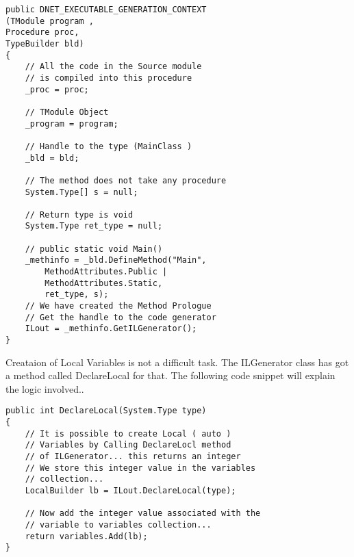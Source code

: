 \lstset{style=csharp}
\begin{lstlisting}
public DNET_EXECUTABLE_GENERATION_CONTEXT
(TModule program ,
Procedure proc,
TypeBuilder bld)
{
	// All the code in the Source module 
	// is compiled into this procedure
	_proc = proc;
	
	// TModule Object
	_program = program;

	// Handle to the type (MainClass )
	_bld = bld;
	
	// The method does not take any procedure
	System.Type[] s = null;
	
	// Return type is void
	System.Type ret_type = null;
	
	// public static void Main()
	_methinfo = _bld.DefineMethod("Main",
		MethodAttributes.Public | 
		MethodAttributes.Static,
		ret_type, s);
	// We have created the Method Prologue
	// Get the handle to the code generator
	ILout = _methinfo.GetILGenerator();
}
\end{lstlisting}
Creataion of Local Variables is not a difficult task. The ILGenerator class has got a method called DeclareLocal for that.
The following code snippet will explain the logic involved..

\lstset{style=csharp}
\begin{lstlisting}
public int DeclareLocal(System.Type type)
{
	// It is possible to create Local ( auto )
	// Variables by Calling DeclareLocl method
	// of ILGenerator... this returns an integer
	// We store this integer value in the variables
	// collection...
	LocalBuilder lb = ILout.DeclareLocal(type);

	// Now add the integer value associated with the
	// variable to variables collection...
	return variables.Add(lb);
}
\end{lstlisting}


